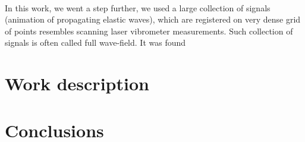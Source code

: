 \documentclass[preprint,12pt]{elsarticle}
\begin{document}
	\paragraph{}

	In this work, we went a step further, we used a large collection of signals (animation of propagating elastic waves), which are registered on very dense grid of points resembles scanning laser vibrometer measurements. Such collection of signals is often called full wave-field. 
	 It was found

	\paragraph{}
	
	
	
	
	\section{Work description}
	
	
	\section{}

	\section{}










	

	\section{Conclusions}
	

	\appendix
	\section{}


	\section*{}

	
	\section*{ }
	{}
	
	
	
\end{document}
